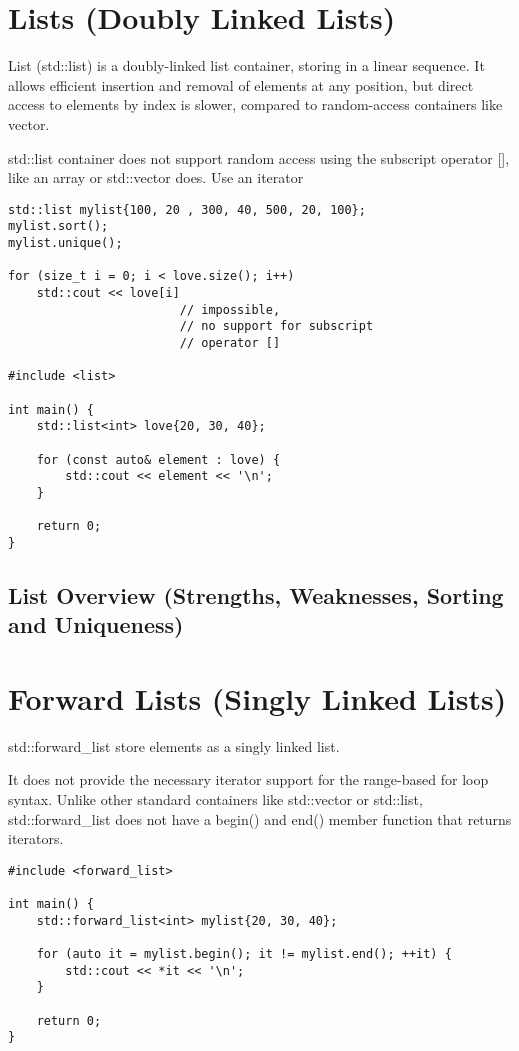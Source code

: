 \section{Lists (Doubly Linked Lists)}

List (std::list) is a doubly-linked list container, storing in a linear sequence. 
It allows efficient insertion and removal of elements at any position, 
but direct access to elements by index is slower,
compared to random-access containers like vector.

std::list container does not support random access using the subscript operator [],
like an array or std::vector does. Use an iterator

\begin{verbatim}
std::list mylist{100, 20 , 300, 40, 500, 20, 100};
mylist.sort();
mylist.unique();

for (size_t i = 0; i < love.size(); i++)
    std::cout << love[i] 
                        // impossible, 
                        // no support for subscript
                        // operator []

#include <list>

int main() {
    std::list<int> love{20, 30, 40};

    for (const auto& element : love) {
        std::cout << element << '\n';
    }

    return 0;
}
\end{verbatim}

\subsection{List Overview (Strengths, Weaknesses, Sorting and Uniqueness)}

\section{Forward Lists (Singly Linked Lists)}

std::forward\_list store elements as a singly linked list.

It does not provide the necessary iterator support for the range-based for loop syntax.
Unlike other standard containers like std::vector or std::list,
std::forward\_list does not have a begin() and end() member function that returns iterators.

\begin{verbatim}
#include <forward_list>

int main() {
    std::forward_list<int> mylist{20, 30, 40};

    for (auto it = mylist.begin(); it != mylist.end(); ++it) {
        std::cout << *it << '\n';
    }

    return 0;
}
\end{verbatim}

